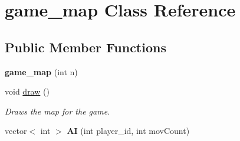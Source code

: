 \hypertarget{classgame__map}{\section{game\+\_\+map Class Reference}
\label{classgame__map}
}
\subsection*{Public Member Functions}
\begin{DoxyCompactItemize}
\item 
\hypertarget{classgame__map_a3f671c319a72c1c72d17554e6dba28d6}{{\bfseries game\+\_\+map} (int n)}\label{classgame__map_a3f671c319a72c1c72d17554e6dba28d6}

\item 
\hypertarget{classgame__map_a6d4a885090b84e4e401b7fb7f689520f}{void \hyperlink{classgame__map_a6d4a885090b84e4e401b7fb7f689520f}{draw} ()}\label{classgame__map_a6d4a885090b84e4e401b7fb7f689520f}

\begin{DoxyCompactList}\small\item\em Draws the map for the game. \end{DoxyCompactList}\item 
\hypertarget{classgame__map_aeb7296da558b7889614bd044d6967139}{vector$<$ int $>$ {\bfseries A\+I} (int player\+\_\+id, int mov\+Count)}\label{classgame__map_aeb7296da558b7889614bd044d6967139}

\end{DoxyCompactItemize}
